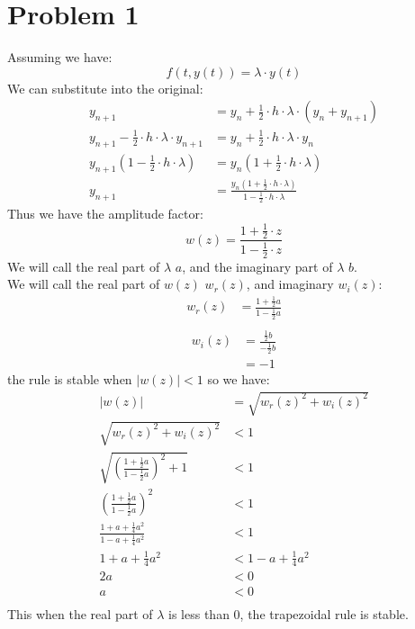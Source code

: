 \documentclass{article}
\title{\thetitle}
\author{\theauthor}
\begin{document}
\maketitle
\section* {Problem 1}
Assuming we have: \\
\[
f(t, y(t)) = \lambda \cdot y(t)
\]
We can substitute into the original: \\
\begin{align*}
y_{n+1} &= y_n + \frac{1}{2} \cdot h \cdot \lambda \cdot (y_n + y_{n+1})\\ 
y_{n+1} - \frac{1}{2} \cdot h \cdot \lambda \cdot y_{n+1} &= y_n + \frac{1}{2} \cdot h \cdot \lambda \cdot y_n \\
y_{n+1}(1 - \frac{1}{2} \cdot h \cdot \lambda) &= y_n(1 + \frac{1}{2} \cdot h \cdot \lambda) \\
y_{n+1} &= \frac{y_n(1 + \frac{1}{2} \cdot h \cdot \lambda)}{1 - \frac{1}{2} \cdot h \cdot \lambda}
\end{align*}
Thus we have the amplitude factor: \\
\[
w(z) = \frac{1 + \frac{1}{2} \cdot z}{1 - \frac{1}{2} \cdot z}
\]
We will call the real part of $\lambda$ $a$, and the imaginary part of $\lambda$ $b$. \\
We will call the real part of $w(z)$ $w_r(z)$, and imaginary $w_i(z)$: \\
\begin{align*}
w_r(z) &= \frac{1 + \frac{1}{2}a}{1 - \frac{1}{2}a} \\
\end{align*}
\begin{align*}
w_i(z) &= \frac{\frac{1}{2}b}{-\frac{1}{2}b} \\
&= -1
\end{align*}
the rule is stable when $|w(z)| < 1$ so we have: \\
\begin{align*}
|w(z)| &= \sqrt{w_r(z)^2 + w_i(z)^2} \\
\sqrt{w_r(z)^2 + w_i(z)^2} &< 1 \\
\sqrt{(\frac{1 + \frac{1}{2}a}{1 - \frac{1}{2}a})^2 + 1} &< 1 \\
(\frac{1 + \frac{1}{2}a}{1 - \frac{1}{2}a})^2 &< 1 \\
\frac{1 + a + \frac{1}{4}a^2}{1 - a + \frac{1}{4}a^2} &<1 \\
1 + a + \frac{1}{4}a^2 &< 1 - a + \frac{1}{4}a^2 \\
2a &< 0 \\
a &< 0 \\
\end{align*}
This when the real part of $\lambda$ is less than 0, the trapezoidal rule is stable. \\
\end{document}
